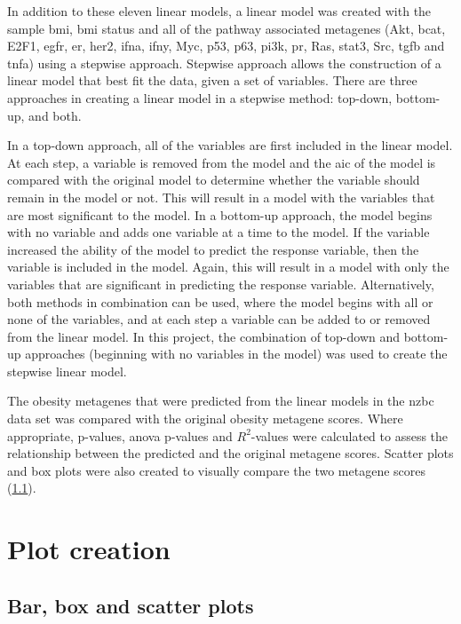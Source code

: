 In addition to these eleven linear models, a linear model was created with the sample \gls{bmi}, \gls{bmi} status and all of the pathway associated metagenes (Akt, \gls{bcat}, E2F1, \gls{egfr}, \gls{er}, \gls{her2}, \gls{ifna}, \gls{ifny}, Myc, p53, p63, \gls{pi3k}, \gls{pr}, Ras, \gls{stat3}, Src, \gls{tgfb} and \gls{tnfa}) using a stepwise approach.
Stepwise approach allows the construction of a linear model that best fit the data, given a set of variables.
There are three approaches in creating a linear model in a stepwise method: top-down, bottom-up, and both.

In a top-down approach, all of the variables are first included in the linear model.
At each step, a variable is removed from the model and the \gls{aic} of the model is compared with the original model to determine whether the variable should remain in the model or not.
This will result in a model with the variables that are most significant to the model.
In a bottom-up approach, the model begins with no variable and adds one variable at a time to the model.
If the variable increased the ability of the model to predict the response variable, then the variable is included in the model.
Again, this will result in a model with only the variables that are significant in predicting the response variable.
Alternatively, both methods in combination can be used, where the model begins with all or none of the variables, and at each step a variable can be added to or removed from the linear model.
In this project, the combination of top-down and bottom-up approaches (beginning with no variables in the model) was used to create the stepwise linear model.

The obesity metagenes that were predicted from the linear models in the \gls{nzbc} data set was compared with the original obesity metagene scores.
Where appropriate, p-values, \gls{anova} p-values and  $R^2$-values were calculated to assess the relationship between the predicted and the original metagene scores.
Scatter plots and box plots were also created to visually compare the two metagene scores (\cref{sub:box_and_scatter_plots}).

\section{Plot creation}
\label{sec:plot_creation}

\subsection{Bar, box and scatter plots}
\label{sub:box_and_scatter_plots}

